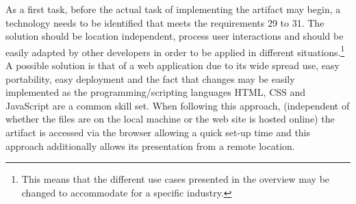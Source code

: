As a first task, before the actual task of implementing the artifact may begin, a technology needs to be identified that meets the requirements 29 to 31. The solution should be location independent, process user interactions and should be easily adapted by other developers in order to be applied in different situations.\footnote{ This means that the different use cases presented in the overview may be changed to accommodate for a specific industry.} A possible solution is that of a web application due to its wide spread use, easy portability, easy deployment and the fact that changes may be easily implemented as the programming/scripting languages HTML, CSS and JavaScript are a common skill set. When following this approach, (independent of whether the files are on the local machine or the web site is hosted online) the artifact is accessed via the browser allowing a quick set-up time and this approach additionally allows its presentation from a remote location.



